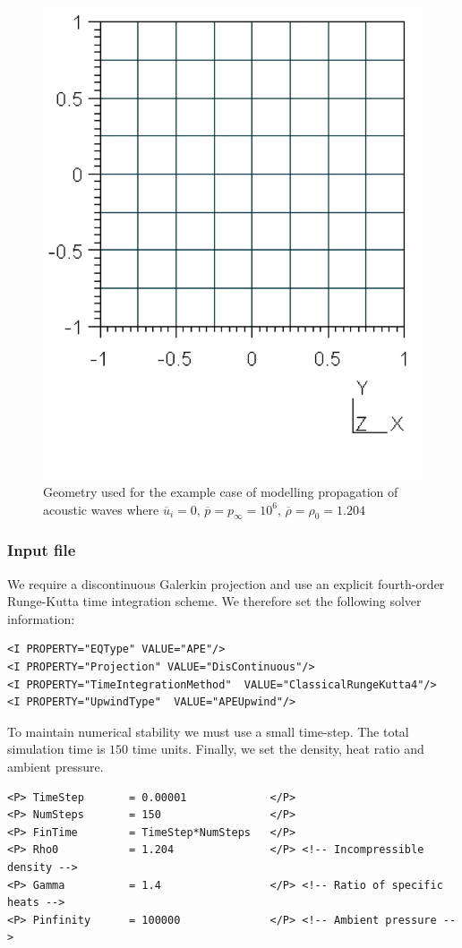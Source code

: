 \begin{figure}
	\centering
	\includegraphics[width=0.5\linewidth]{Figures/APE_Geometry.png}
	\caption{Geometry used for the example case of modelling propagation of
	acoustic waves where $\overline{u}_i = 0, \, \overline{p}=p_{\infty}=10^6, \, \overline{\rho} = \rho_0 = 1.204$}
	\label{f:apesolver:geometry}
\end{figure}

\subsubsection{Input file}
We require a discontinuous Galerkin projection and use an explicit
fourth-order Runge-Kutta time integration scheme. We therefore set the following
solver information:
\begin{lstlisting}[style=XmlStyle]
<I PROPERTY="EQType" VALUE="APE"/> 
<I PROPERTY="Projection" VALUE="DisContinuous"/>
<I PROPERTY="TimeIntegrationMethod"  VALUE="ClassicalRungeKutta4"/>
<I PROPERTY="UpwindType"  VALUE="APEUpwind"/>
\end{lstlisting}

To maintain numerical stability we must use a small time-step. The total
simulation time is $150$ time units. Finally, we set the density, heat ratio and
ambient pressure.
\begin{lstlisting}[style=XMLStyle]
<P> TimeStep       = 0.00001             </P>
<P> NumSteps       = 150                 </P>
<P> FinTime        = TimeStep*NumSteps   </P>
<P> Rho0           = 1.204               </P> <!-- Incompressible density -->
<P> Gamma          = 1.4                 </P> <!-- Ratio of specific heats -->
<P> Pinfinity      = 100000              </P> <!-- Ambient pressure -->
\end{lstlisting}

